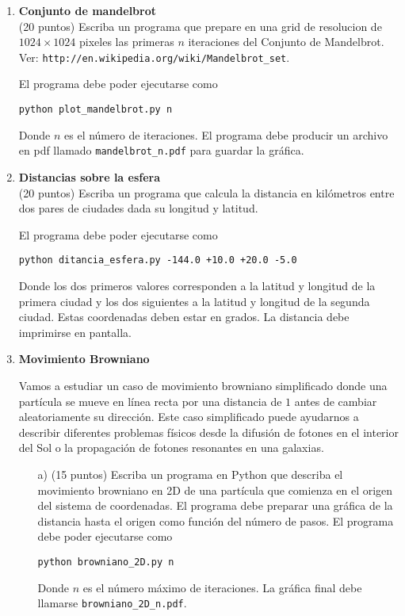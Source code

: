 \documentclass{article}
\begin{document}
\begin{enumerate}
\item
{\bf Conjunto de mandelbrot}\\
(20 puntos)
Escriba un programa que prepare en una grid de resolucion de
$1024\times 1024$ pixeles las primeras $n$ iteraciones del
Conjunto de
Mandelbrot. Ver: \verb"http://en.wikipedia.org/wiki/Mandelbrot_set". 

El programa debe poder ejecutarse como

\begin{verbatim}
python plot_mandelbrot.py n
\end{verbatim}
Donde $n$ es el n\'umero de iteraciones. El programa debe producir un
archivo en pdf llamado \verb"mandelbrot_n.pdf" para guardar la
gr\'afica. 

\item 
{\bf Distancias sobre la esfera}\\
(20 puntos)
Escriba un programa que calcula la distancia en kil\'ometros entre dos pares de
ciudades dada su longitud y latitud.

El programa debe poder ejecutarse como
\begin{verbatim}
python ditancia_esfera.py -144.0 +10.0 +20.0 -5.0
\end{verbatim}

Donde los dos primeros valores corresponden a la latitud y longitud de
la primera ciudad y los dos siguientes a la latitud y
longitud de la segunda ciudad. Estas coordenadas deben estar en
grados. La distancia debe imprimirse en pantalla.

\item
{\bf Movimiento Browniano}

Vamos a estudiar un caso de movimiento browniano simplificado donde
una part\'icula se mueve en l\'inea recta por una distancia de $1$
antes de cambiar aleatoriamente su direcci\'on. Este caso simplificado
puede ayudarnos a describir diferentes problemas f\'isicos desde la
difusi\'on de fotones en el interior del Sol o la propagaci\'on de
fotones resonantes en una galaxias.

\begin{itemize}
\item[a)] (15 puntos) Escriba un programa en Python que describa el movimiento
  browniano en 2D de una part\'icula que comienza en el origen del sistema
  de coordenadas. El programa debe preparar una gr\'afica de la distancia
  hasta el origen como funci\'on del n\'umero de pasos. 
El programa debe poder ejecutarse como
\begin{verbatim}
python browniano_2D.py n
\end{verbatim}
Donde $n$ es el n\'umero m\'aximo de iteraciones. La gr\'afica final
debe llamarse \verb"browniano_2D_n.pdf".


\end{itemize}
\end{enumerate}
\end{document}
